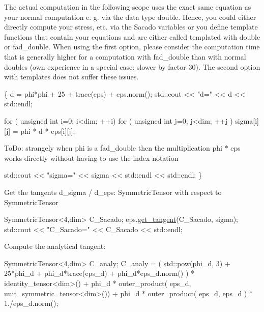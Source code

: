 The actual computation in the following scope uses the exact same equation as your normal computation e. g. via the data type double. Hence, you could either directly compute your stress, etc. via the Sacado variables or you define template functions that contain your equations and are either called templated with double or fad\+\_\+double. When using the first option, please consider the computation time that is generally higher for a computation with fad\+\_\+double than with normal doubles (own experience in a special case\+: slower by factor 30). The second option with templates does not suffer these issues. 
\begin{DoxyCode}
\{
d = phi*phi + 25 + trace(eps) + eps.norm();
std::cout << \textcolor{stringliteral}{"d="} << d << std::endl;

\textcolor{keywordflow}{for} ( \textcolor{keywordtype}{unsigned} \textcolor{keywordtype}{int} i=0; i<dim; ++i)
  \textcolor{keywordflow}{for} ( \textcolor{keywordtype}{unsigned} \textcolor{keywordtype}{int} j=0; j<dim; ++j )
      sigma[i][j] = phi * d * eps[i][j];
\end{DoxyCode}
 To\+Do\+: strangely when phi is a fad\+\_\+double then the multiplication phi $\ast$ eps works directly without having to use the index notation 
\begin{DoxyCode}
std::cout << \textcolor{stringliteral}{"sigma="} << sigma << std::endl << std::endl;
\}
\end{DoxyCode}
 Get the tangents d\+\_\+sigma / d\+\_\+eps\+: Symmetric\+Tensor with respect to Symmetric\+Tensor 
\begin{DoxyCode}
SymmetricTensor<4,dim> C\_Sacado;
eps.\hyperlink{classSacado__Wrapper_1_1SymTensor_ab97427c3b5cab279e58607cf431ab262}{get\_tangent}(C\_Sacado, sigma);
std::cout << \textcolor{stringliteral}{"C\_Sacado="} << C\_Sacado << std::endl;
\end{DoxyCode}
 Compute the analytical tangent\+: 
\begin{DoxyCode}
SymmetricTensor<4,dim> C\_analy;
C\_analy = ( std::pow(phi\_d, 3) + 25*phi\_d + phi\_d*trace(eps\_d) + phi\_d*eps\_d.norm() ) * 
      identity\_tensor<dim>()
          + phi\_d * outer\_product( eps\_d, unit\_symmetric\_tensor<dim>())
          + phi\_d * outer\_product( eps\_d, eps\_d ) * 1./eps\_d.norm();
\end{DoxyCode}
